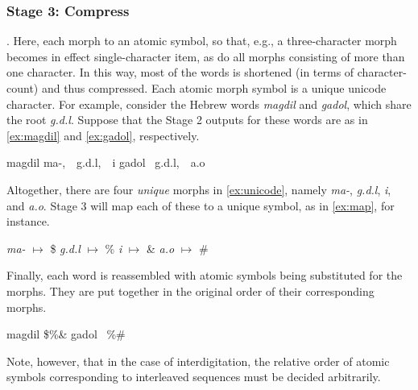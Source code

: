 {{\subsubsection{Stage 3: Compress}. Here, each morph to an atomic symbol, 
so that, e.g., a three-character morph becomes in effect single-character item, 
as do all morphs consisting of more than one character. In this way, most of 
the words is shortened (in terms of character-count) and thus compressed.
Each atomic morph symbol is a unique unicode character. For example, 
consider the 
Hebrew words \textit{magdil} and \textit{gadol}, which share the root 
\textit{g.d.l}. 
Suppose that the Stage 2 outputs for these words are as in \eqref{ex:magdil} and 
\eqref{ex:gadol}, respectively. 
\begin{exe}  \ex \label{ex:unicode} \begin{xlist}
	\ex magdil \quad ma-, \,\, g.d.l, \,\, i 
	\label{ex:magdil}
	\ex gadol \, \quad  g.d.l, \,\, a.o
	\label{ex:gadol}
	\end{xlist}
\end{exe}
Altogether, there are four \emph{unique} morphs in \eqref{ex:unicode}, namely \textit{ma-}, \textit{g.d.l}, 
\textit{i}, and \textit{a.o}.
Stage 3 will map each of these to a unique symbol, as in \eqref{ex:map}, for instance.
\begin{exe}
	\ex  \textit{ma-} $\mapsto$ \$ \quad \textit{g.d.l} $\mapsto$ \% \quad
\textit{i} $\mapsto$ \& \quad \textit{a.o} $\mapsto$ \#
\label{ex:map}
\end{exe}
Finally, each word is reassembled with atomic symbols being substituted for the morphs. 
They are put together in the original order of their corresponding morphs.
\begin{exe}  
	\ex \label{ex:reassembled} \begin{xlist}
	\ex magdil \quad \$\%\&
	\label{ex:re-magdil}
	\ex gadol \, \quad \%\#
	\label{ex:re-gadol}
	\end{xlist}
\end{exe}
Note, however, that in the case of interdigitation, the relative order of atomic symbols corresponding to interleaved sequences must be decided arbitrarily.

}}
